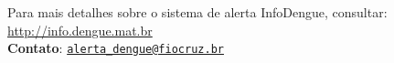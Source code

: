 \documentclass[10pt]{article} %
\begin{document}
\begin{minipage}[t]{1\linewidth}
      \BackToContents %

\vspace{1cm}

\hline
Para mais detalhes sobre o sistema de alerta InfoDengue, consultar: \url{http://info.dengue.mat.br}\\

\textbf{Contato}: \href{alerta\_dengue@fiocruz.br}{\nolinkurl{alerta\_dengue@fiocruz.br} }
\end{minipage} %
\end{document}
